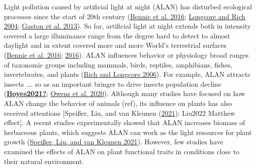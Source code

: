 \documentclass[
]{article}
\begin{document}
Light pollution caused by artificial light at night (ALAN) has disturbed
ecological processes since the start of 20th century
(\protect\hyperlink{ref-Bennie2016}{Bennie et al. 2016};
\protect\hyperlink{ref-Longcore2004}{Longcore and Rich 2004};
\protect\hyperlink{ref-Gaston2013}{Gaston et al. 2013}). So far,
artificial light at night extends both in intensity covered a large
illuminance range from the degree hard to detect to almost daylight and
in extent covered more and more World's terrestrial surfaces
(\protect\hyperlink{ref-Bennie2016}{Bennie et al. 2016};
\protect\hyperlink{ref-Falchi2016}{2016}). ALAN influences behavior or
physiology broad ranges of taxonomic groups including mammals, birds,
reptiles, amphibians, fishes, invertebrates, and plants
(\protect\hyperlink{ref-Rich2006}{Rich and Longcore 2006}). For example,
ALAN attracts insects \ldots. so as an important bringer to drive
insects population decline
(\protect\hyperlink{ref-Boyes2021}{\textbf{Boyes2021?}};
\protect\hyperlink{ref-Owens2020}{Owens et al. 2020}). Although many
studies have focused on how ALAN change the behavior of animals (ref),
its influence on plants has also received attentions {[}Speißer, Liu,
and van Kleunen (\protect\hyperlink{ref-Speisser2021a}{2021}); Liu2022
Matthew effect{]}. A recent studies experimentally showed that ALAN
increases biomass of herbaceous plants, which suggests ALAN can work as
the light resources for plant growth
(\protect\hyperlink{ref-Speisser2021a}{Speißer, Liu, and van Kleunen
2021}). However, few studies have examined the effects of ALAN on plant
functional traits in conditions close to their natural environment.
\end{document}
